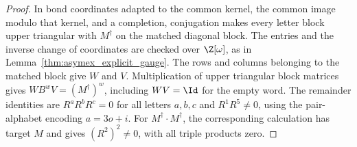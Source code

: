 \begin{proof}
    \leanok
    In bond coordinates adapted to the common kernel, the common image
    modulo that kernel, and a completion, conjugation makes every letter
    block upper triangular with $M^\dagger$ on the matched diagonal block.
    The entries and the inverse change of coordinates are checked over
    $\Z[\omega]$, as in Lemma~\ref{thm:asymex_explicit_gauge}.
    The rows and columns belonging to the matched block give $W$ and $V$.
    Multiplication of upper triangular block matrices gives
    $WB^wV=(M^\dagger)^w$, including $WV=\Id$ for the empty word.
    The remainder identities are
    $R^aR^bR^c=0$ for all letters $a,b,c$ and $R^1R^5\neq0$,
    using the pair-alphabet encoding $a=3o+i$.
    For $M^\dagger\cdot M^\dagger$, the corresponding calculation has
    target $M$ and gives $(R^2)^2\neq0$, with all triple products zero.
\end{proof}

